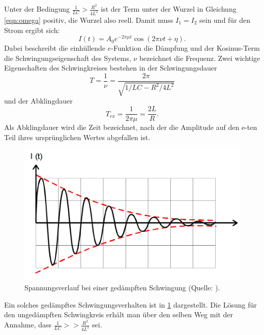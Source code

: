 Unter der Bedingung $\frac{1}{LC} > \frac{R^2}{4L^2}$
ist der Term unter der Wurzel in Gleichung
\ref{eqn:omega} positiv,
die Wurzel also reell. Damit muss $I_1 = I_2$ sein und für den Strom ergibt
sich:
\begin{equation}
  I(t) = A_0e^{-2\pi \mu t}\cos{(2\pi \nu t + \eta)}.
  \label{eqn:Ischwingung}
\end{equation}
Dabei beschreibt die einhüllende $e$-Funktion die Dämpfung und der
Kosinus-Term die Schwingungseigenschaft des Systems, $\nu$ bezeichnet die
Frequenz.
Zwei wichtige Eigenschaften des Schwingkreises bestehen in der Schwingungsdauer
\begin{equation}
  T =\frac{1}{\nu} = \frac{2\pi}{\sqrt{1/LC - R^2/4L^2}}
\end{equation}
und der Abklingdauer
\begin{equation}
  T_{ex} = \frac{1}{2\pi\mu} = \frac{2L}{R}.
\end{equation}
Als Abklingdauer wird die Zeit bezeichnet, nach der die Amplitude auf den e-ten
Teil ihres ursprünglichen Wertes abgefallen ist.

\begin{figure}
  \centering
  \includegraphics[width=\textwidth]{gedschwingung.png}
  \caption{Spannungsverlauf bei einer gedämpften Schwingung
  (Quelle: \cite{officialmanual}).}
  \label{fig:gedschw}
\end{figure}
Ein solches gedämpftes Schwingungsverhalten ist in \ref{fig:gedschw} dargestellt.
Die Lösung für den ungedämpften Schwingkreis erhält man über den selben Weg mit
der Annahme, dass $\frac{1}{LC} >> \frac{R^2}{4L^2}$ sei.

